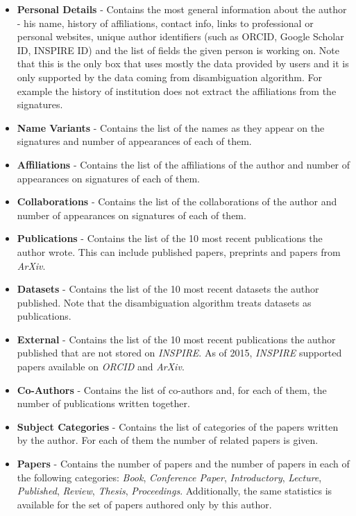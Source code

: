 \documentclass{pracamgr}
\begin{document}
\begin{itemize}
\item \textbf{Personal Details} - Contains the most general information about the author - his name, history of affiliations, contact info, links to professional or personal websites, unique author identifiers (such as ORCID, Google Scholar ID, INSPIRE ID) and the list of fields the given person is working on. Note that this is the only box that uses mostly the data provided by users and it is only supported by the data coming from disambiguation algorithm. For example the history of institution does not extract the affiliations from the signatures.
\item \textbf{Name Variants} - Contains the list of the names as they appear on the signatures and number of appearances of each of them.
\item \textbf{Affiliations} - Contains the list of the affiliations of the author and number of appearances on signatures of each of them.
\item \textbf{Collaborations} - Contains the list of the collaborations of the author and number of appearances on signatures of each of them.
\item \textbf{Publications} - Contains the list of the 10 most recent publications the author wrote. This can include published papers, preprints and papers from \textit{ArXiv}.
\item \textbf{Datasets} - Contains the list of the 10 most recent datasets the author published. Note that the disambiguation algorithm treats datasets as publications.
\item \textbf{External} - Contains the list of the 10 most recent publications the author published that are not stored on \textit{INSPIRE}. As of 2015, \textit{INSPIRE} supported papers available on \textit{ORCID} and \textit{ArXiv}.
\item \textbf{Co-Authors} - Contains the list of co-authors and, for each of them, the number of publications written together.
\item \textbf{Subject Categories} - Contains the list of categories of the papers written by the author. For each of them the number of related papers is given.
\item \textbf{Papers} - Contains the number of papers and the number of papers in each of the following categories: \textit{Book}, \textit{Conference Paper}, \textit{Introductory}, \textit{Lecture}, \textit{Published}, \textit{Review}, \textit{Thesis}, \textit{Proceedings}. Additionally, the same statistics is available for the set of papers authored only by this author.

\end{itemize}
\end{document}
